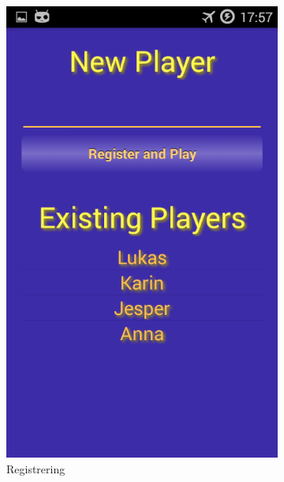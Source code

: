 \begin{figure}[ht]
    \centering
    \begin{subfigure}[b]{0.3\textwidth}
        \includegraphics[width=\textwidth]{./img/bruksanvisning/2.png}
        \caption{Registrering}
        \label{fig:registrering}
    \end{subfigure}
    \begin{subfigure}[b]{0.3\textwidth}

\end{subfigure}
\end{figure}
